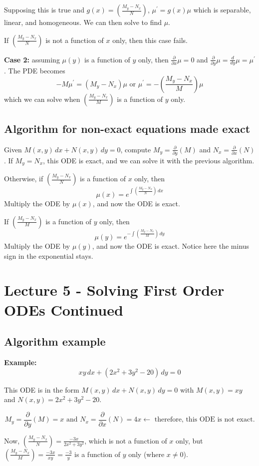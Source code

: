 \documentclass[11pt]{article}
\newcommand{\example}{\textbf{Example: }}
\newcommand{\fpdx}{\frac{\partial}{\partial x}} %
\newcommand{\fpdy}{\frac{\partial}{\partial y}} %
\newcommand{\dx}{\,dx} %
\newcommand{\dy}{\,dy} %
\begin{document}
	Supposing this is true and $g(x) = \left(\frac{M_y - N_x}{N}\right)$, $\mu^{\prime} = g(x) \mu$ which is separable, linear, and homogeneous. We can then solve to find $\mu$.

	If $\left(\frac{M_y - N_x}{N}\right)$ is not a function of $x$ only, then this case fails.

	\textbf{Case 2:} assuming $\mu(y)$ is a function of $y$ only, then $\fpdx \mu = 0$ and $\fpdy \mu = \frac{d}{dy} \mu = \mu^{\prime}$. The PDE becomes
		$$ - M \mu^{\prime} = (M_y - N_x) \mu \text{ or } \mu^{\prime} = - \left(\frac{M_y - N_x}{M}\right) \mu $$
	which we can solve when $\left(\frac{M_y - N_x}{M}\right)$ is a function of $y$ only.

\subsection{Algorithm for non-exact equations made exact}
	Given $M(x,y)\dx + N(x,y)\dy = 0$, compute $M_y = \fpdy (M)$ and $N_x = \fpdx (N)$. If $M_y = N_x$, this ODE is exact, and we can solve it with the previous algorithm.

	Otherwise, if $\left(\frac{M_y - N_x}{N}\right)$ is a function of $x$ only, then
		$$ \mu (x) = e^{\int \left(\frac{M_y - N_x}{N}\right)\dx} $$
	Multiply the ODE by $\mu(x)$, and now the ODE is exact.

	If $\left(\frac{M_y - N_x}{M}\right)$ is a function of $y$ only, then
		$$ \mu (y) = e^{- \int \left(\frac{M_y - N_x}{M}\right)\dy} $$
	Multiply the ODE by $\mu(y)$, and now the ODE is exact. Notice here the minus sign in the exponential stays.

\section{Lecture 5 - Solving First Order ODEs Continued}
\subsection{Algorithm example}
	\example
		$$ xy \dx + (2x^2 + 3y^2 - 20)\dy = 0 $$

	This ODE is in the form $M(x,y)\dx + N(x,y)\dy = 0$ with $M(x,y) = xy$ and $N(x,y) = 2x^2 + 3y^2 - 20$.

	$$ M_y = \fpdy(M) = x \text{ and } N_x = \fpdx(N) = 4x \leftarrow \text{ therefore, this ODE is not exact.} $$

	Now, $\left(\frac{M_y - N_x}{N}\right) = \frac{-3x}{2x^2 + 3y^2}$, which is not a function of $x$ only, but $\left(\frac{M_y - N_x}{M}\right) = \frac{-3x}{xy} = \frac{-3}{y}$ is a function of $y$ only (where $x \neq 0$).
\end{document}
